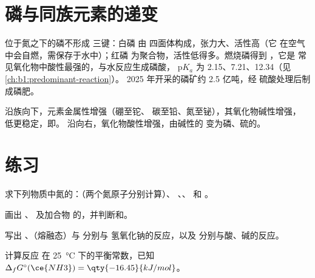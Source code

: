 \section{磷与同族元素的递变}

位于氮之下的磷不形成  三键：白磷
由  四面体构成，张力大、活性高（它
在空气中会自燃，需保存于水中）；红磷
为聚合物，活性低得多。燃烧磷得到 ，它是
常见氧化物中酸性最强的，与水反应生成磷酸，
$\mathrm{p}K_a$ 为 2.15、7.21、12.34（见\cref{ch:b1:predominant-reaction}）。
2025 年开采的磷矿约 2.5 亿吨，经
硫酸处理后制成磷肥。

沿族向下，元素金属性增强（硼至铊、
碳至铅、氮至铋），其氧化物碱性增强，
低更稳定，即。
沿向右，氧化物酸性增强，由碱性的 
变为磷、硫的。

\section{练习}

\begin{exercise}[$\star$]\label{exo:b1:p-block-13-15:1}
求下列物质中氮的：（两个氮原子分别计算）、
、、 和 。
\end{exercise}

\begin{exercise}[$\star$]\label{exo:b1:p-block-13-15:2}
画出 、 及加合物
 的，并判断和。
\end{exercise}

\begin{exercise}[$\star$]\label{exo:b1:p-block-13-15:3}
写出 、（熔融态）与  分别与
氢氧化钠的反应，以及  分别与酸、碱的反应。
\end{exercise}

\begin{exercise}[$\star$]\label{exo:b1:p-block-13-15:4}
计算反应  在
\qty{25}{\celsius} 下的平衡常数，已知 $\Delta_f G^\circ(\ce{NH3}) =
\qty{-16.45}{kJ/mol}$。
\end{exercise}

